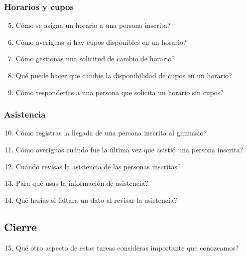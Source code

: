 \documentclass[11pt,a4paper]{article}
\begin{document}
\subsubsection*{Horarios y cupos}

\begin{enumerate}
    \setcounter{enumi}{4}
    \item \textquestiondown{}Cómo se asigna un horario a una persona inscrita?
    \item \textquestiondown{}Cómo averiguas si hay cupos disponibles en un horario?
    \item \textquestiondown{}Cómo gestionas una solicitud de cambio de horario?
    \item \textquestiondown{}Qué puede hacer que cambie la disponibilidad de cupos en un horario?
    \item \textquestiondown{}Cómo responderías a una persona que solicita un horario sin cupos?
\end{enumerate}

\subsubsection*{Asistencia}

\begin{enumerate}
    \setcounter{enumi}{9}
    \item \textquestiondown{}Cómo registras la llegada de una persona inscrita al gimnasio?
    \item \textquestiondown{}Cómo averiguas cuándo fue la última vez que asistió una persona inscrita?
    \item \textquestiondown{}Cuándo revisas la asistencia de las personas inscritas?
    \item \textquestiondown{}Para qué usas la información de asistencia?
    \item \textquestiondown{}Qué harías si faltara un dato al revisar la asistencia?
\end{enumerate}

\subsection{Cierre}

\begin{enumerate}
    \setcounter{enumi}{14}
    \item \textquestiondown{}Qué otro aspecto de estas tareas consideras importante que conozcamos?
\end{enumerate}
\end{document}
